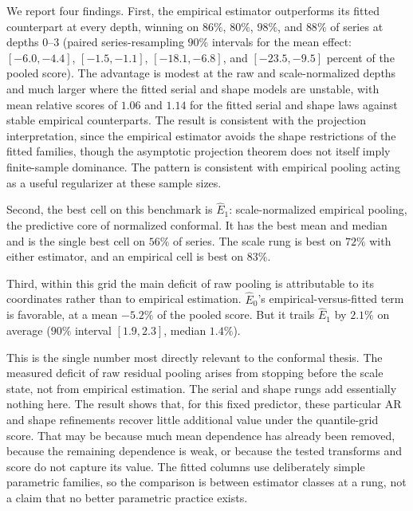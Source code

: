 \documentclass[11pt]{article}
\theoremstyle{remark}
\begin{document}
We report four findings. First, the empirical estimator outperforms its fitted counterpart
at every depth, winning on $86\%$, $80\%$, $98\%$, and $88\%$ of series at depths $0$--$3$
(paired series-resampling $90\%$ intervals for the mean effect: $[-6.0,-4.4]$,
$[-1.5,-1.1]$, $[-18.1,-6.8]$, and $[-23.5,-9.5]$ percent of the pooled score). The
advantage is modest at the raw and scale-normalized depths and much larger where the fitted
serial and shape models are unstable, with mean relative scores of $1.06$ and $1.14$ for the
fitted serial and shape laws against stable empirical counterparts. The result is consistent
with the projection interpretation, since the empirical estimator avoids the shape
restrictions of the fitted families, though the asymptotic projection theorem does not itself
imply finite-sample dominance. The pattern is consistent with empirical pooling acting as a
useful regularizer at these sample sizes.

Second, the best cell on this benchmark is $\widehat E_1$: scale-normalized empirical
pooling, the predictive core of normalized conformal. It has the best mean and median and is
the single best cell on $56\%$ of series. The scale rung is best on $72\%$ with either
estimator, and an empirical cell is best on $83\%$.

Third, within this grid the main deficit of raw pooling is attributable to its coordinates
rather than to empirical estimation. $\widehat E_0$'s
empirical-versus-fitted term is favorable, at a mean $-5.2\%$ of the pooled score. But it trails $\widehat E_1$ by $2.1\%$ on average ($90\%$ interval $[1.9,2.3]$, median
$1.4\%$).

\begin{center}
\end{center}

This is the single number most directly relevant to the conformal thesis. The measured
deficit of raw residual pooling arises from stopping before the scale state, not from
empirical estimation. The serial and shape rungs add essentially nothing here. The result shows that, for this fixed predictor, these particular AR and shape refinements
recover little additional value under the quantile-grid score. That may be because much mean
dependence has already been removed, because the remaining dependence is weak, or because the
tested transforms and score do not capture its value. The fitted columns use
deliberately simple parametric families, so the comparison is between estimator classes at a
rung, not a claim that no better parametric practice exists.
\end{document}
